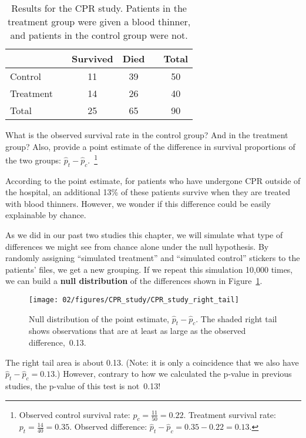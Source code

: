\begin{table}[ht]
\centering
\begin{tabular}{lccccc}
\hline
			&& Survived 	& Died 	&& Total \\
\hline
Control		&& 11		& 39		&& 50 \\
Treatment		&& 14		& 26		&& 40 \\
\hline
Total			&& 25		& 65		&& 90 \\
\hline
\end{tabular}
\caption{Results for the CPR study. Patients in the treatment group were given a blood thinner, and patients in the control group were not.}
\label{resultsForCPRStudyInSmallSampleSection}
\end{table}

\begin{exercise}
What is the observed survival rate in the control group? And in the treatment group? Also, provide a point estimate of the difference in survival proportions of the two groups: $\hat{p}_t - \hat{p}_c$.~\footnote{Observed control survival rate: $p_c = \frac{11}{50} = 0.22$. Treatment survival rate: $p_t = \frac{14}{40} = 0.35$. Observed difference: $\hat{p}_t - \hat{p}_c = 0.35 - 0.22 = 0.13$.}
\end{exercise}

According to the point estimate, for patients who have undergone CPR outside of the hospital, an additional 13\% of these patients survive when they are treated with blood thinners. However, we wonder if this difference could be easily explainable by chance.

As we did in our past two studies this chapter, we will simulate what type of differences we might see from chance alone under the null hypothesis. By randomly assigning ``simulated treatment'' and ``simulated control'' stickers to the patients' files, we get a new grouping. If we repeat this simulation 10,000 times, we can build a \textbf{null distribution} of the differences shown in Figure~\ref{CPR_study_right_tail}.

\begin{figure}[ht]
\centering
\texttt{[image: 02/figures/CPR\_study/CPR\_study\_right\_tail]}
\caption{Null distribution of the point estimate, $\hat{p}_t - \hat{p}_c$. The shaded right tail shows observations that are at least as large as the observed difference,~0.13.}
\label{CPR_study_right_tail}
\end{figure}

The right tail area is about 0.13. (Note: it is only a coincidence that we also have $\hat{p}_t - \hat{p}_c=0.13$.) However, contrary to how we calculated the p-value in previous studies, the p-value of this test is not~0.13!

